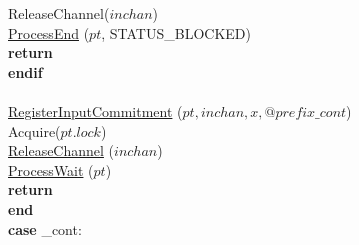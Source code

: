 \documentclass[a4paper,11pt]{article}
\newenvironment{program}{
  \begin{sffamily}
  \begin{scriptsize}
  \begin{tabbing}}
 {\end{tabbing}
  \end{scriptsize}
  \end{sffamily}}
\newcommand{\kw}[1]{\textsf{\textbf{#1}}}
\newcommand{\synchro}[1]{\textcolor{synchrocolor}{#1}}
\newcommand{\myref}[1]{
  \hyperref[#1]{#1}
}
\begin{document}
\begin{program}
  \>\> \synchro{ReleaseChannel($inchan$)} \\
 \> \> \myref{ProcessEnd}($pt$, STATUS\_BLOCKED) \\
 \> \> \kw{return} \\
  \>\kw{endif} \\
\\
  \> \myref{RegisterInputCommitment}($pt, inchan, x, @prefix\_cont$) \\
  \>\synchro{Acquire($pt.lock$)} \\
  \>\synchro{\myref{ReleaseChannel}($inchan$)} \\
  \>\synchro{\myref{ProcessWait}($pt$)} \\
  \>\kw{return} \\
  \kw{end} \\
 \kw{case} \@prefix\_cont:
\end{program}
\end{document}

